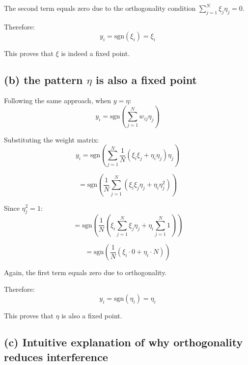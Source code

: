 \documentclass[11pt]{article}
\begin{document}
The second term equals zero due to the orthogonality condition $\sum_{j=1}^N \xi_j \eta_j = 0$.

Therefore:
\begin{equation}
y_i = \text{sgn}(\xi_i) = \xi_i
\end{equation}

This proves that $\xi$ is indeed a fixed point.

\subsection*{(b) the pattern $\eta$ is also a fixed point}

Following the same approach, when $y = \eta$:
\begin{equation}
y_i = \text{sgn}\left(\sum_{j=1}^N w_{ij} \eta_j\right)
\end{equation}

Substituting the weight matrix:
\begin{equation}
y_i = \text{sgn}\left(\sum_{j=1}^N \frac{1}{N}(\xi_i\xi_j + \eta_i\eta_j) \eta_j\right)
\end{equation}

\begin{equation}
= \text{sgn}\left(\frac{1}{N}\sum_{j=1}^N (\xi_i\xi_j\eta_j + \eta_i\eta_j^2)\right)
\end{equation}

Since $\eta_j^2 = 1$:
\begin{equation}
= \text{sgn}\left(\frac{1}{N}\left(\xi_i\sum_{j=1}^N\xi_j\eta_j + \eta_i\sum_{j=1}^N 1\right)\right)
\end{equation}

\begin{equation}
= \text{sgn}\left(\frac{1}{N}\left(\xi_i \cdot 0 + \eta_i \cdot N\right)\right)
\end{equation}

Again, the first term equals zero due to orthogonality.

Therefore:
\begin{equation}
y_i = \text{sgn}(\eta_i) = \eta_i
\end{equation}

This proves that $\eta$ is also a fixed point.

\subsection*{(c) Intuitive explanation of why orthogonality reduces interference}
\end{document}
